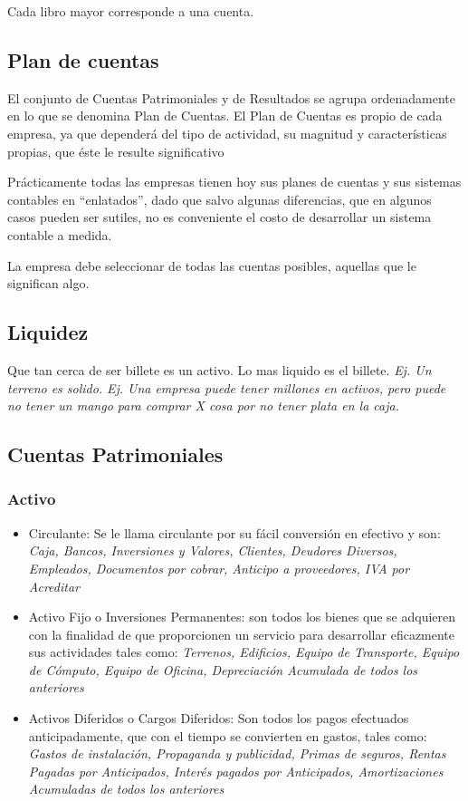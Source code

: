 \documentclass[titlepage,a4paper]{article}
\begin{document}

Cada libro mayor corresponde a una cuenta.

\subsection{Plan de cuentas}
El conjunto de Cuentas Patrimoniales y de Resultados se agrupa ordenadamente en lo que se
denomina Plan de Cuentas. El Plan de Cuentas es propio de cada empresa, ya que dependerá del tipo de
actividad, su magnitud y características propias, que éste le resulte significativo

Prácticamente todas las empresas tienen hoy sus planes de cuentas y sus sistemas contables en
“enlatados”, dado que salvo algunas diferencias, que en algunos casos pueden ser sutiles, no es conveniente
el costo de desarrollar un sistema contable a medida.

La empresa debe seleccionar de todas las cuentas posibles, aquellas que le significan algo.

\subsection{Liquidez}
Que tan cerca de ser billete es un activo. Lo mas liquido es el billete. \textit{Ej. Un terreno es solido.} \textit{Ej. Una empresa puede tener millones en activos, pero puede no tener un mango para comprar X cosa por no tener plata en la caja.}


\subsection{Cuentas Patrimoniales}
\subsubsection*{Activo}
\begin{itemize}
    \item Circulante: Se le llama circulante por su fácil conversión en efectivo y son: \textit{Caja, Bancos, Inversiones y Valores, Clientes, Deudores Diversos, Empleados, Documentos por cobrar, Anticipo a proveedores, IVA por Acreditar}
    \item Activo Fijo o Inversiones Permanentes: son todos los bienes que se adquieren con la finalidad de que proporcionen un servicio para desarrollar eficazmente sus actividades tales como: \textit{Terrenos, Edificios, Equipo de Transporte, Equipo de Cómputo, Equipo de Oficina, Depreciación Acumulada de todos los anteriores}
    \item Activos Diferidos o Cargos Diferidos: Son todos los pagos efectuados anticipadamente, que con el tiempo se convierten en gastos, tales como: \textit{Gastos de instalación, Propaganda y publicidad, Primas de seguros, Rentas Pagadas por Anticipados, Interés pagados por Anticipados, Amortizaciones Acumuladas de todos los anteriores}
\end{itemize}
\end{document}
